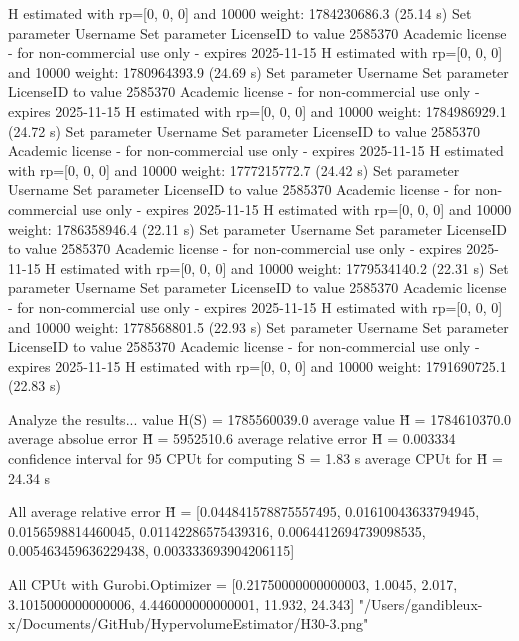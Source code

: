   H estimated with rp=[0, 0, 0] and 10000 weight:  1784230686.3  (25.14 s)
Set parameter Username
Set parameter LicenseID to value 2585370
Academic license - for non-commercial use only - expires 2025-11-15
  H estimated with rp=[0, 0, 0] and 10000 weight:  1780964393.9  (24.69 s)
Set parameter Username
Set parameter LicenseID to value 2585370
Academic license - for non-commercial use only - expires 2025-11-15
  H estimated with rp=[0, 0, 0] and 10000 weight:  1784986929.1  (24.72 s)
Set parameter Username
Set parameter LicenseID to value 2585370
Academic license - for non-commercial use only - expires 2025-11-15
  H estimated with rp=[0, 0, 0] and 10000 weight:  1777215772.7  (24.42 s)
Set parameter Username
Set parameter LicenseID to value 2585370
Academic license - for non-commercial use only - expires 2025-11-15
  H estimated with rp=[0, 0, 0] and 10000 weight:  1786358946.4  (22.11 s)
Set parameter Username
Set parameter LicenseID to value 2585370
Academic license - for non-commercial use only - expires 2025-11-15
  H estimated with rp=[0, 0, 0] and 10000 weight:  1779534140.2  (22.31 s)
Set parameter Username
Set parameter LicenseID to value 2585370
Academic license - for non-commercial use only - expires 2025-11-15
  H estimated with rp=[0, 0, 0] and 10000 weight:  1778568801.5  (22.93 s)
Set parameter Username
Set parameter LicenseID to value 2585370
Academic license - for non-commercial use only - expires 2025-11-15
  H estimated with rp=[0, 0, 0] and 10000 weight:  1791690725.1  (22.83 s)

Analyze the results...
  value H(S)                  = 1785560039.0 
  average value H̃             = 1784610370.0 
  average absolue error H̃     = 5952510.6 
  average relative error H̃    = 0.003334 
  confidence interval for 95%
  CPUt for computing S         = 1.83 s
  average CPUt for H̃           = 24.34 s

All average relative error H̃ = [0.044841578875557495, 0.01610043633794945, 0.0156598814460045, 0.01142286575439316, 0.0064412694739098535, 0.005463459636229438, 0.003333693904206115]

All CPUt with Gurobi.Optimizer = [0.21750000000000003, 1.0045, 2.017, 3.1015000000000006, 4.446000000000001, 11.932, 24.343]
"/Users/gandibleux-x/Documents/GitHub/HypervolumeEstimator/H30-3.png"